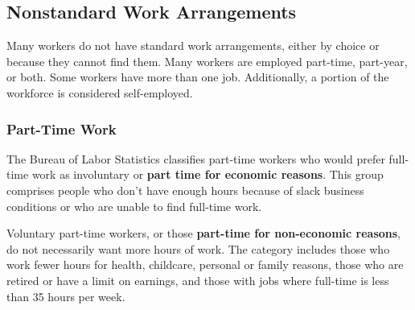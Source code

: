 \begin{minipage}{0.36\textwidth}
\small 
\end{minipage}\hspace{5mm}
\begin{minipage}{0.36\textwidth}
\vspace{3.4cm}

\hspace{5mm} 

\end{minipage}
\newpage


\subsection*{Nonstandard Work Arrangements}
\begin{minipage}{0.76\textwidth} 
\hypertarget{labns}{\label{labns}}
\small Many workers do not have standard work arrangements, either by choice or because they cannot find them. Many workers are employed part-time, part-year, or both. Some workers have more than one job. Additionally, a portion of the workforce is considered self-employed. 
\subsubsection*{Part-Time Work}
\small  The Bureau of Labor Statistics classifies part-time workers who would prefer full-time work as involuntary or \textbf{part time for economic reasons}. This group comprises people who don't have enough hours because of slack business conditions or who are unable to find full-time work. 

Voluntary part-time workers, or those \textbf{part-time for non-economic reasons}, do not necessarily want more hours of work. The category includes those who work fewer hours for health, childcare, personal or family reasons, those who are retired or have a limit on earnings, and those with jobs where full-time is less than 35 hours per week. 
\end{minipage}

